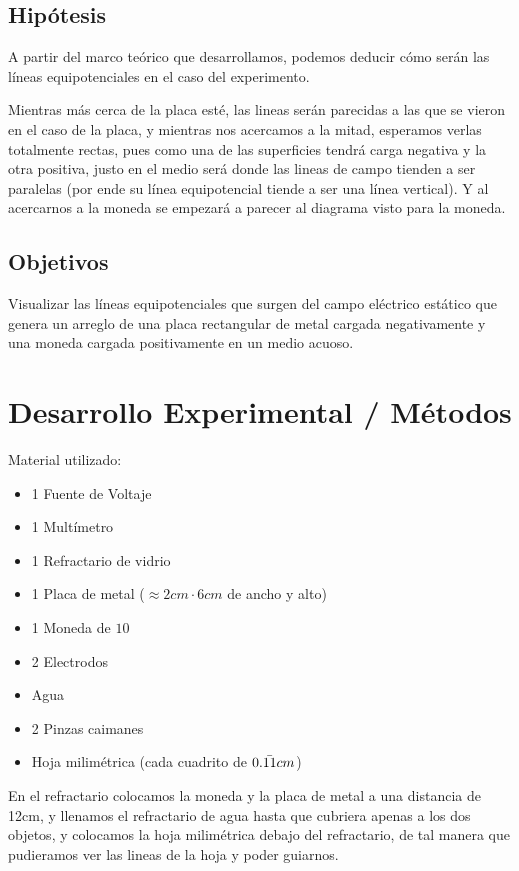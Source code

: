 \documentclass[article,12pt]{elsarticle}
\begin{document}
\subsection{Hipótesis}
A partir del marco teórico que desarrollamos, podemos deducir cómo serán las líneas equipotenciales en el caso del experimento.

Mientras más cerca de la placa esté, las lineas serán parecidas a las que se vieron en el caso de la placa, y mientras nos acercamos a la mitad, esperamos verlas totalmente rectas, pues como una de las superficies tendrá carga negativa y la otra positiva, justo en el medio será donde las lineas de campo tienden a ser paralelas (por ende su línea equipotencial tiende a ser una línea vertical). Y al acercarnos a la moneda se empezará a parecer al diagrama visto para la moneda. \\


\subsection{Objetivos}
Visualizar las líneas equipotenciales que surgen del campo eléctrico estático que genera un arreglo de una placa rectangular de metal cargada negativamente y una moneda cargada positivamente en un medio acuoso.
\section{Desarrollo Experimental / Métodos}
Material utilizado:
\begin{itemize}
    \item 1 Fuente de Voltaje
    \item 1 Multímetro
    \item 1 Refractario de vidrio
    \item 1 Placa de metal ($\approx 2cm \cdot 6cm$ de ancho y alto)
    \item 1 Moneda de $10$
    \item 2 Electrodos
    \item Agua
    \item 2 Pinzas caimanes
    \item Hoja milimétrica (cada cuadrito de $0.\Bar{11}cm$)
\end{itemize}
En el refractario colocamos la moneda y la placa de metal a una distancia de 12cm, y llenamos el refractario de agua hasta que cubriera apenas a los dos objetos, y colocamos la hoja milimétrica debajo del refractario, de tal manera que pudieramos ver las lineas de la hoja y poder guiarnos.
\end{document}
